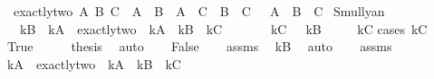 \begin{isabellebody}
\begin{exercise}[subtitle=Logčki lavirinti.]
\ \ {\isachardoublequoteopen}exactly{\isacharunderscore}{\kern0pt}two\ A\ B\ C\ {\isasymlongleftrightarrow}\ {\isacharparenleft}{\kern0pt}{\isacharparenleft}{\kern0pt}A\ {\isasymand}\ B{\isacharparenright}{\kern0pt}\ {\isasymor}\ {\isacharparenleft}{\kern0pt}A\ {\isasymand}\ C{\isacharparenright}{\kern0pt}\ {\isasymor}\ {\isacharparenleft}{\kern0pt}B\ {\isasymand}\ C{\isacharparenright}{\kern0pt}{\isacharparenright}{\kern0pt}\ {\isasymand}\ {\isasymnot}\ {\isacharparenleft}{\kern0pt}A\ {\isasymand}\ B\ {\isasymand}\ C{\isacharparenright}{\kern0pt}{\isachardoublequoteclose}\isanewline
\isanewline
{}\isamarkupfalse%
\ Smullyan{\isacharunderscore}{\kern0pt}{}{\isacharunderscore}{\kern0pt}{}{\isacharcolon}{\kern0pt}\isanewline
\ \ \ {\isachardoublequoteopen}kB\ {\isasymlongleftrightarrow}\ {\isacharparenleft}{\kern0pt}kA\ {\isasymlongleftrightarrow}\ exactly{\isacharunderscore}{\kern0pt}two\ {\isacharparenleft}{\kern0pt}{\isasymnot}\ kA{\isacharparenright}{\kern0pt}\ {\isacharparenleft}{\kern0pt}{\isasymnot}\ kB{\isacharparenright}{\kern0pt}\ {\isacharparenleft}{\kern0pt}{\isasymnot}\ kC{\isacharparenright}{\kern0pt}{\isacharparenright}{\kern0pt}{\isachardoublequoteclose}\isanewline
\ \ \ \ \ \ \ {\isachardoublequoteopen}kC\ {\isasymlongleftrightarrow}\ {\isasymnot}\ kB{\isachardoublequoteclose}\isanewline
\ \ \ \ \ {\isachardoublequoteopen}kC{\isachardoublequoteclose}\isanewline
%
\isadelimproof
%
\endisadelimproof
%
\isatagproof
{}\isamarkupfalse%
{\isacharparenleft}{\kern0pt}cases\ kC{\isacharparenright}{\kern0pt}\isanewline
\ \ \isamarkupfalse%
\ True\isanewline
\ \ \isamarkupfalse%
\ \isamarkupfalse%
\ {\isacharquery}{\kern0pt}thesis\ \isamarkupfalse%
\ auto\isanewline
{}\isamarkupfalse%
\isanewline
\ \ \isamarkupfalse%
\ False\isanewline
\ \ \isamarkupfalse%
\ assms{\isacharparenleft}{\kern0pt}{}{\isacharparenright}{\kern0pt}\ \isamarkupfalse%
\ {\isachardoublequoteopen}kB{\isachardoublequoteclose}\ \isamarkupfalse%
\ auto\isanewline
\ \ \isamarkupfalse%
\ assms{\isacharparenleft}{\kern0pt}{}{\isacharparenright}{\kern0pt}\ \isamarkupfalse%
\ {\isacharasterisk}{\kern0pt}{\isacharcolon}{\kern0pt}{\isachardoublequoteopen}kA\ {\isasymlongleftrightarrow}\ exactly{\isacharunderscore}{\kern0pt}two\ {\isacharparenleft}{\kern0pt}{\isasymnot}\ kA{\isacharparenright}{\kern0pt}\ {\isacharparenleft}{\kern0pt}{\isasymnot}\ kB{\isacharparenright}{\kern0pt}\ {\isacharparenleft}{\kern0pt}{\isasymnot}\ kC{\isacharparenright}{\kern0pt}{\isachardoublequoteclose}\ \isamarkupfalse%

\end{exercise}
\end{isabellebody}
